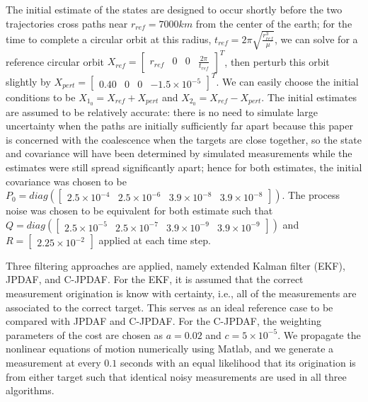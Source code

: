 \documentclass[letterpaper, 10pt, conference]{ieeeconf}
\newcommand{\EditTL}[1]{{\color{red}\protect #1}}
\begin{document}
The initial estimate of the states are designed to occur shortly before the two trajectories cross paths near $r_{ref}=7000km$ from the center of the earth; for the time to complete a circular orbit at this radius, $t_{ref}=2\pi \sqrt{\frac{r_{ref}^3}{\mu}}$, we can solve for a reference circular orbit $X_{ref}=\begin{bmatrix} r_{ref} & 0 & 0 & \frac{2\pi}{t_{ref}}\end{bmatrix}^T$, then perturb this orbit slightly by $X_{pert}=\begin{bmatrix} 0.40 & 0 & 0 & -1.5\times10^{-5}\end{bmatrix}^T$. We can easily choose the initial conditions to be $X_{1_0}= X_{ref}+X_{pert}$ and $X_{2_0}= X_{ref}-X_{pert}$. The initial estimates are assumed to be relatively accurate: there is no need to simulate large uncertainty when the paths are initially sufficiently far apart because this paper is concerned with the coalescence when the targets are close together, so the state and covariance will have been determined by simulated measurements while the estimates were still spread significantly apart; hence for both estimates, the initial covariance was chosen to be $P_0=diag(\begin{bmatrix}
2.5\times10^{-4} & 2.5\times10^{-6} & 3.9\times10^{-8} & 3.9\times10^{-8} \end{bmatrix})$.
The process noise was chosen to be equivalent for both estimate such that $Q=diag(\begin{bmatrix}
2.5\times10^{-5} & 2.5\times10^{-7} & 3.9\times10^{-9}& 3.9\times10^{-9}\end{bmatrix})$ and $R=\begin{bmatrix}
2.25\times10^{-2}
\end{bmatrix}$ applied at each time step.



Three filtering approaches are applied, namely extended Kalman filter (EKF), JPDAF, and C-JPDAF. For the EKF, it is assumed that the correct measurement origination is know with certainty, i.e., all of the measurements are associated to the correct target. This serves as an ideal reference case to be compared with JPDAF and C-JPDAF. For the C-JPDAF, the weighting parameters of the cost are chosen as $a=0.02$ and $c=5\times10^{-5}$. We propagate the nonlinear equations of motion numerically using Matlab, and we generate a measurement at every $0.1$ seconds with an equal likelihood that its origination is from either target such that identical noisy measurements are used in all three algorithms.
\end{document}
